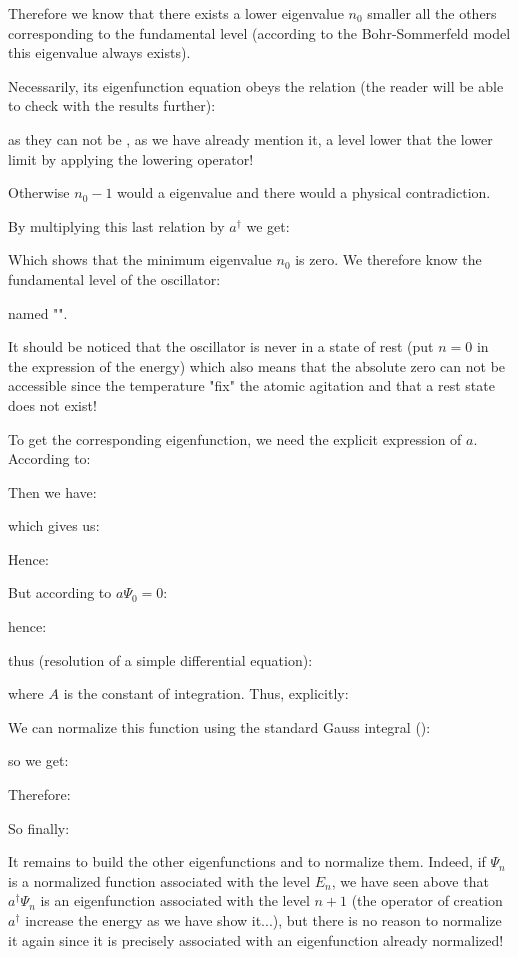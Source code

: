 	Therefore we know that there exists a lower eigenvalue $n_0$ smaller all the others corresponding to the fundamental level (according to the Bohr-Sommerfeld model this eigenvalue always exists).
	
	Necessarily, its eigenfunction equation obeys the relation (the reader will be able to check with the results further):
	
	as they can not be , as we have already mention it, a level lower that the lower limit by applying the lowering operator!
	
	Otherwise $n_0-1$ would a eigenvalue and there would a physical contradiction.

	By multiplying this last relation by $a^\dagger$ we get:
	
	Which shows that the minimum eigenvalue $n_0$ is zero. We therefore know the fundamental level of the oscillator:
	
	named "".
	\begin{tcolorbox}[title=Remark,colframe=black,arc=10pt]
	It should be noticed that the oscillator is never in a state of rest (put $n = 0$ in the expression of the energy) which also means that the absolute zero can not be accessible since the temperature "fix" the atomic agitation and that a rest state does not exist!
	\end{tcolorbox}
	To get the corresponding eigenfunction, we need the explicit expression of $a$. According to:
	
	Then we have:
	
	which gives us:
	
	Hence:
	
	But according to $a\Psi_0=0$:
	
	hence:
	
	thus (resolution of a simple differential equation):
	
	where $A$ is the constant of integration. Thus, explicitly:
	
	We can normalize this function using the standard Gauss integral ():
	
	so we get:
	 
	Therefore:
	
	So finally:
	
	It remains to build the other eigenfunctions and to normalize them. Indeed, if $\Psi_n$ is a normalized function associated with the level $E_n$, we have seen above that $a^\dagger\Psi_n$ is an eigenfunction associated with the level $n+1$ (the operator of creation $a^\dagger$ increase the energy as we have show it...), but there is no reason to normalize it again since it is precisely associated with an eigenfunction already normalized!

